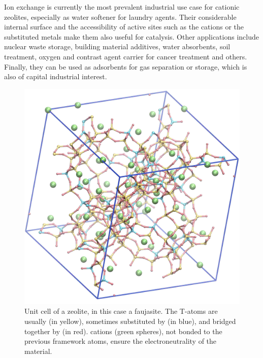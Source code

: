 \documentclass[main.tex]{subfiles}
\begin{document}
Ion exchange is currently the most prevalent industrial use case for cationic zeolites, especially as water softener for laundry agents\autocite{ZeoliteSynthesisUnconventionalDusselier}. Their considerable internal surface and the accessibility of active sites such as the cations or the substituted metals make them also useful for catalysis\autocite{ExoticZeoliteComposition}. Other applications include nuclear waste storage\autocite{ZeoliteRadioactive}, building material additives\autocite{ZeoliteConcrete}, water absorbents\autocite{ZeoliteWater}, soil treatment\autocite{ZeoliteSoil}, oxygen and contrast agent carrier for cancer treatment\autocite{ZeoliteCancer} and others. Finally, they can be used as adsorbents for gas separation or storage, which is also of capital industrial interest.

\begin{figure}
	\centering
	\includegraphics[width=0.8\linewidth]{figures/cations/FAU2.5_framework_Na.jpg}
	\caption{Unit cell of a zeolite, in this case a faujasite. The T-atoms are usually  (in yellow), sometimes substituted by  (in blue), and bridged together by  (in red).  cations (green spheres), not bonded to the previous framework atoms, ensure the electroneutrality of the material.}\label{fig:FAU25}
\end{figure}
\end{document}
